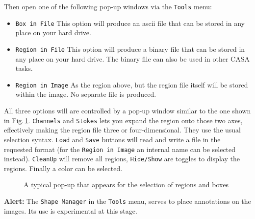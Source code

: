 Then open one of the following  pop-up windows via the {\tt Tools}
menu: 


\begin{itemize}

\item {\tt Box in File}   This option will produce an ascii file that
  can be stored in any place on your hard drive. 

\item {\tt Region in File}  This option will produce a binary file that
  can be stored in any place on your hard drive. The binary file can
  also be used in other CASA tasks. 

\item {\tt Region in Image} As the region above, but the region file
  itself will be stored within the image. No separate file is
  produced. 

\end{itemize}

All three options will are controlled by a pop-up window similar to
the one shown in Fig.\,\ref{fig:viewer_filebox}. {\tt Channels} and
{\tt Stokes} lets you expand the region onto those two axes,
effectively making the region file three or four-dimensional. They use
the usual selection syntax. {\tt Load} and {\tt Save} buttons will
read and write a file in the requested format (for the {\tt Region in
  Image} an internal name can be selected instead). {\tt CleanUp} will
remove all regions, {\tt Hide/Show} are toggles to display the
regions. Finally a color can be selected.  



\begin{figure}[h!]
\begin{center}
\caption{\label{fig:viewer_filebox} A typical pop-up that appears for the
  selection of regions and boxes}
\hrulefill
\end{center}
\end{figure}

{\bf Alert: } The {\tt Shape Manager} in the {\tt Tools} menu, serves to place
annotations on the images. Its use is experimental at this stage.



%
%
%

